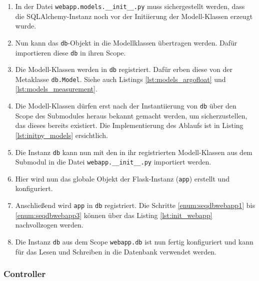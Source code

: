 \begin{enumerate}
 \item 
        In der Datei \texttt{webapp.models.\_\_init\_\_.py} muss sichergestellt werden, dass die SQLAlchemy-Instanz noch vor der Initiierung der Modell-Klassen erzeugt wurde.
 \item 
        Nun kann das \texttt{db}-Objekt in die Modellklassen übertragen werden. Dafür importieren diese \texttt{db} in ihren Scope.
 \item 
        Die Modell-Klassen werden in \texttt{db} registriert. Dafür erben diese von der Metaklasse \texttt{db.Model}. Siehe auch Listings \ref{lst:models_argofloat} und \ref{lst:models_measurement}.
        

    
 \item 
        Die Modell-Klassen dürfen erst nach der Instantiierung von \texttt{db} über den Scope des Submodules heraus bekannt gemacht werden, um sicherzustellen, das dieses bereits existiert. Die Implementierung des Ablaufs ist in Listing \ref{lst:initpy_models} ersichtlich.
        
 \item  \label{enum:seqdbwebapp1}
        Die Instanz \texttt{db} kann nun mit den in ihr registrierten Modell-Klassen  aus dem Submodul in die Datei \texttt{webapp.\_\_init\_\_.py} importiert werden.

\item   
        Hier wird nun das globale Objekt der Flask-Instanz (\texttt{app}) erstellt und konfiguriert. 
        
\item   \label {enum:seqdbwebapp3}
        Anschließend wird \texttt{app} in \texttt{db} registriert. Die Schritte \ref{enum:seqdbwebapp1} bis \ref{enum:seqdbwebapp3} können über das Listing \ref{lst:init_webapp} nachvollzogen werden.
        
\item   Die Instanz \texttt{db} aus dem Scope        
        \texttt{webapp.db} ist nun fertig konfiguriert und kann für das Lesen und Schreiben in die Datenbank verwendet werden.
\end{enumerate}


\pagebreak
\subsubsection{Controller}


